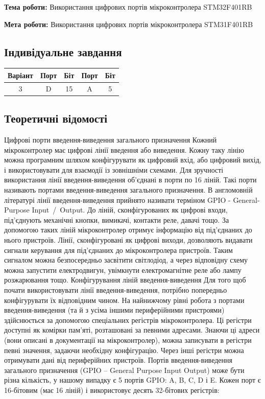 \documentclass[12pt]{extarticle}
\begin{document}
\textbf{Тема роботи:} Використання цифрових портів мікроконтролера STM32F401RB

\vspace{12pt}

\textbf{Мета роботи:} Використання цифрових портів мікроконтролера STM31F401RB
\subsection*{Індивідуальне завдання}
\begin{center}
    \begin{tabular}{| c | c | c | c | c |}
        \hline
        Варіант & Порт & Біт & Порт & Біт\\
        \hline
           3  & D & 15 & A & 5\\
        \hline
   
    \end{tabular}
\end{center}

\subsection*{Теоретичні відомості}
Цифрові порти введення-виведення загального призначення
Кожний мікроконтролер має цифрові лінії введення або виведення. Кожну таку лінію можна програмним шляхом конфігурувати як цифровий вхід, або цифровий вихід, і використовувати для взаємодії із зовнішніми схемами. Для зручності використання лінії введення-виведення об'єднані в порти по 16 ліній. Такі порти називають портами введення-виведення загального призначення. В англомовній літературі лінії введення-виведення прийнято називати терміном GPIO - General-Purpose Input / Output.
До ліній, сконфігурованих як цифрові входи, під’єднують механічні кнопки, вимикачі, контакти реле, давачі тощо. За допомогою таких ліній мікроконтролер отримує інформацію від під’єднаних до нього пристроїв.
Лінії, сконфігуровані як цифрові виходи, дозволяють видавати сигнали керування для під’єднаних до мікроконтролера пристроїв. Таким сигналом можна безпосередньо засвітити світлодіод, а через відповідну схему можна запустити електродвигун, увімкнути електромагнітне реле або лампу розжарювання тощо.
Конфігурування ліній введення-виведення
Для того щоб почати використовувати лінії введення-виведення, потрібно попередньо конфігурувати їх відповідним чином. 
На найнижчому рівні робота з портами введення-виведення (та й з усіма іншими периферійними пристроями) здійснюється за допомогою спеціальних регістрів мікроконтролера. Ці регістри доступні як комірки пам'яті, розташовані за певними адресами. Знаючи ці адреси (вони описані в документації на мікроконтролер), можна записувати в регістри певні значення, задаючи необхідну конфігурацію. Через інші регістри можна отримувати дані від периферійних пристроїв.
Портів введення-виведення загального призначення (GPIO – General Purpose Input Output) може бути різна кількість, у нашому випадку  є 5 портів GPIO: A, B, C, D і E. 
Кожен порт є 16-бітовим (має 16 ліній) і використовує  десять 32-бітових регістрів: 
\end{document}
